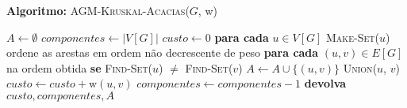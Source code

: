 \documentclass[
    12pt,
    a4paper,
    brazil,
    english
]{article}
\begin{document}
\begin{algorithm}
    \caption{\textbf{Algoritmo:} AGM-\textsc{Kruskal}-\textsc{Acacias}($G$, w)}
    \begin{algorithmic}[1]
        \State $A \gets \emptyset$
        \State $componentes \gets |V[G]|$
        \State $custo \gets 0$
        \State \textbf{para cada} $u \in V[G]$
            \State \hspace{1em} \textnormal{\textsc{Make}-\textsc{Set}}($u$)
        \State ordene as arestas em ordem não decrescente de peso
        \State \textbf{para cada} $(u, v) \in E[G]$ na ordem obtida
            \State \hspace{1em} \textbf{se} \textsc{Find-Set}($u$) $\neq$ \textsc{Find-Set}($v$)
            \State \hspace{2em} $A \gets A \cup \{(u, v)\}$
            \State \hspace{2em} \textsc{Union}($u$, $v$)
            \State \hspace{2em} $custo \gets custo + \text{w}(u, v)$
            \State \hspace{2em} $componentes \gets componentes - 1$
            \State \textbf{devolva} $custo, componentes, A$
        \end{algorithmic}
    \end{algorithm}
\end{document}
